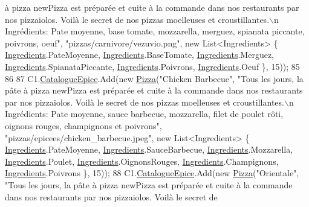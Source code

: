 \begin{DoxyCode}
{       à pizza newPizza est préparée et cuite à la commande dans nos restaurants par nos pizzaiolos. Voilà le
       secret de nos pizzas moelleuses et croustillantes.\(\backslash\)n Ingrédients: Pate moyenne, base tomate, mozzarella, merguez,
       spianata piccante, poivrons, oeuf"}, \textcolor{stringliteral}{"pizzas/carnivore/vezuvio.png"}, \textcolor{keyword}{new} List<Ingredients> \{ 
      \hyperlink{namespaceModele_a001a8e89e56a724f24a249ba98080d41}{Ingredients}.PateMoyenne, \hyperlink{namespaceModele_a001a8e89e56a724f24a249ba98080d41}{Ingredients}.BaseTomate, 
      \hyperlink{namespaceModele_a001a8e89e56a724f24a249ba98080d41}{Ingredients}.Merguez, \hyperlink{namespaceModele_a001a8e89e56a724f24a249ba98080d41}{Ingredients}.SpianataPiccante, 
      \hyperlink{namespaceModele_a001a8e89e56a724f24a249ba98080d41}{Ingredients}.Poivrons, \hyperlink{namespaceModele_a001a8e89e56a724f24a249ba98080d41}{Ingredients}.Oeuf \}, 15));
85 
86 
87             C1.\hyperlink{classModele_1_1Catalogue_a633610212f42551a5755212e21bedbca}{CatalogueEpice}.Add(\textcolor{keyword}{new} \hyperlink{classModele_1_1Pizza}{Pizza}(\textcolor{stringliteral}{"Chicken Barbecue"}, \textcolor{stringliteral}{"Tous les jours, la pâte
       à pizza newPizza est préparée et cuite à la commande dans nos restaurants par nos pizzaiolos. Voilà le
       secret de nos pizzas moelleuses et croustillantes.\(\backslash\)n Ingrédients: Pate moyenne, sauce barbecue, mozzarella,
       filet de poulet rôti, oignons rouges, champignons et poivrons"}, \textcolor{stringliteral}{"pizzas/epicees/chicken\_barbecue.jpeg"}, \textcolor{keyword}{new} 
      List<Ingredients> \{ \hyperlink{namespaceModele_a001a8e89e56a724f24a249ba98080d41}{Ingredients}.PateMoyenne, \hyperlink{namespaceModele_a001a8e89e56a724f24a249ba98080d41}{Ingredients}.SauceBarbecue, 
      \hyperlink{namespaceModele_a001a8e89e56a724f24a249ba98080d41}{Ingredients}.Mozzarella, \hyperlink{namespaceModele_a001a8e89e56a724f24a249ba98080d41}{Ingredients}.Poulet, \hyperlink{namespaceModele_a001a8e89e56a724f24a249ba98080d41}{Ingredients}.OignonsRouges, 
      \hyperlink{namespaceModele_a001a8e89e56a724f24a249ba98080d41}{Ingredients}.Champignons, \hyperlink{namespaceModele_a001a8e89e56a724f24a249ba98080d41}{Ingredients}.Poivrons \}, 15));
88             C1.\hyperlink{classModele_1_1Catalogue_a633610212f42551a5755212e21bedbca}{CatalogueEpice}.Add(\textcolor{keyword}{new} \hyperlink{classModele_1_1Pizza}{Pizza}(\textcolor{stringliteral}{"Orientale"}, \textcolor{stringliteral}{"Tous les jours, la pâte à
       pizza newPizza est préparée et cuite à la commande dans nos restaurants par nos pizzaiolos. Voilà le secret de
}
\end{DoxyCode}
